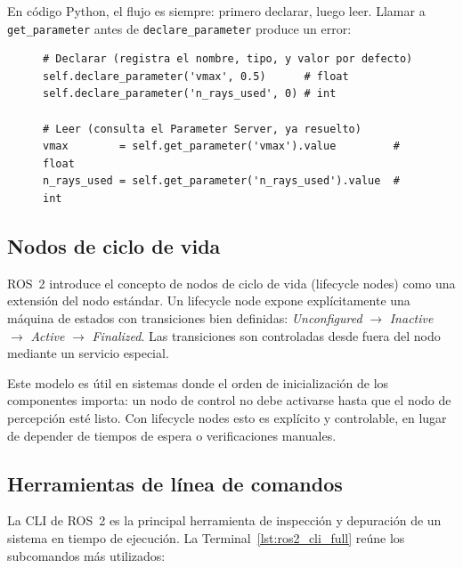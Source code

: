 En código Python, el flujo es siempre: primero declarar, luego leer. Llamar a \texttt{get\_parameter} antes de \texttt{declare\_parameter} produce un error:

\begin{figure}[H]
\centering
\begin{lstlisting}[style=python, caption={Declaración y lectura de parámetros en rclpy.}, label={lst:params_py}]
# Declarar (registra el nombre, tipo, y valor por defecto)
self.declare_parameter('vmax', 0.5)      # float
self.declare_parameter('n_rays_used', 0) # int

# Leer (consulta el Parameter Server, ya resuelto)
vmax        = self.get_parameter('vmax').value         # float
n_rays_used = self.get_parameter('n_rays_used').value  # int
\end{lstlisting}
\end{figure}

\subsection{Nodos de ciclo de vida}

ROS~2 introduce el concepto de nodos de ciclo de vida (lifecycle nodes) como una extensión del nodo estándar. Un lifecycle node expone explícitamente una máquina de estados con transiciones bien definidas: \textit{Unconfigured} $\to$ \textit{Inactive} $\to$ \textit{Active} $\to$ \textit{Finalized}. Las transiciones son controladas desde fuera del nodo mediante un servicio especial.

Este modelo es útil en sistemas donde el orden de inicialización de los componentes importa: un nodo de control no debe activarse hasta que el nodo de percepción esté listo. Con lifecycle nodes esto es explícito y controlable, en lugar de depender de tiempos de espera o verificaciones manuales.

\subsection{Herramientas de línea de comandos}

La CLI de ROS~2 es la principal herramienta de inspección y depuración de un sistema en tiempo de ejecución. La Terminal~\ref{lst:ros2_cli_full} reúne los subcomandos más utilizados:

